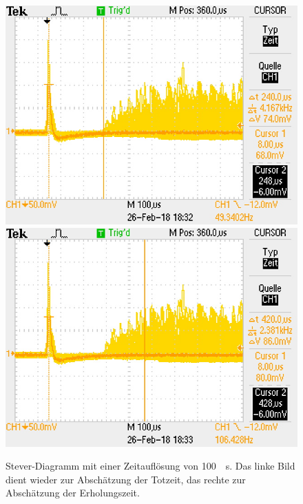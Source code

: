 \documentclass[12pt,a4paper]{article}
\begin{document}
\begin{figure}
\centering
\includegraphics[scale=0.49]{Bilder/Stever/Stever2_1.PNG}
\includegraphics[scale=0.49]{Bilder/Stever/Stever2_2.PNG}
\caption{Stever-Diagramm mit einer Zeitauflösung von \SI{100}{\mu s}. Das linke Bild dient wieder zur Abschätzung der Totzeit, das rechte zur Abschätzung der Erholungszeit.}
\label{fig:Stever2}
\end{figure}
\end{document}
